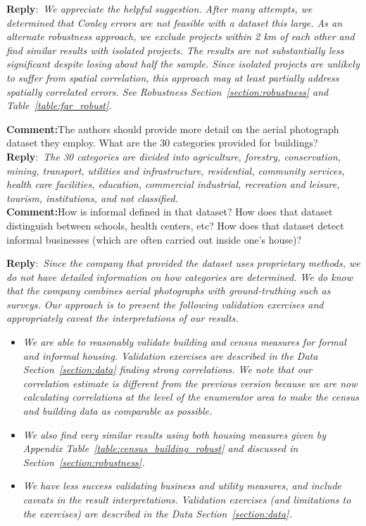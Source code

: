 \documentclass{article}
\newcommand{\reply}{\medskip \noindent \textbf{Reply}:\ \textit }
\newcommand{\sr}{\begin{minipage}{\dimexpr\textwidth-3cm}}
\newcommand{\er}{\end{minipage}}
\newcommand{\cc}{\medskip \noindent \textbf{Comment:}\hspace{2em}}
\begin{document}
\sr
\reply{We appreciate the helpful suggestion.  After many attempts, we determined that Conley errors are not feasible with a dataset this large.  As an alternate robustness approach, we exclude projects within 2 km of each other and find similar results with isolated projects.  The results are not substantially less significant despite losing about half the sample.  Since isolated projects are unlikely to suffer from spatial correlation, this approach may at least partially address spatially correlated errors.  See Robustness Section~\ref{section:robustness} and  Table~\ref{table:far_robust}.}\\
\er

\cc The authors should provide more detail on the aerial photograph dataset they employ. What are the 30 categories provided for buildings? 
\reply{The 30 categories are divided into agriculture, forestry, conservation, mining, transport, utilities and infrastructure, residential, community services, health care facilities, education, commercial industrial, recreation and leisure, tourism, institutions, and not classified.  }\\

\cc How is informal defined in that dataset? How does that dataset distinguish between schools, health centers, etc? How does that dataset detect informal businesses (which are often carried out inside one’s house)?

\sr
\reply{Since the company that provided the dataset uses proprietary methods, we do not have detailed information on how categories are determined.  We do know that the company combines aerial photographs with ground-truthing such as surveys.  Our approach is to present the following validation exercises and appropriately caveat the interpretations of our results. }
\begin{itemize}
\item \textit{ We are able to reasonably validate building and census measures for formal and informal housing.  Validation exercises are described in the Data Section~\ref{section:data} finding strong correlations.   We note that our correlation estimate is different from the previous version because we are now calculating correlations at the level of the enumerator area to make the census and building data as comparable as possible.  }
\item \textit{We also find very similar results using both housing measures given by Appendix Table~\ref{table:census_building_robust} and discussed in Section~\ref{section:robustness}.}
\item \textit{ We have less success validating business and utility measures, and include caveats in the result interpretations. Validation exercises (and limitations to the exercises) are described in the Data Section~\ref{section:data}.} 
\end{itemize} 
\er\\
\end{document}
